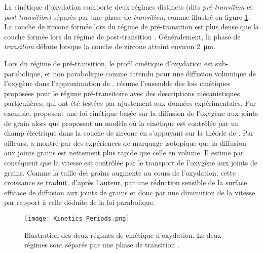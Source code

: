 \begin{refsection}
    La cinétique d'oxydation comporte deux régimes distincts (dits \emph{pré-transition} et \emph{post-transition}) séparés par
    une phase de \emph{transition}, comme illustré en figure \ref{fig:Zy2_Kinetics_Regimes}. 
    La couche de zircone formée lors du régime de pré-transition est plus dense que la couche formée lors du régime de
    post-transition \citep{IAEA1998}.
    Généralement, la phase de \emph{transition} débute lorsque la couche de zircone atteint
    environ \SI{2}{\micro\meter}.

    Lors du régime de pré-transition, le profil cinétique d'oxydation est sub-parabolique, et non parabolique
    comme attendu pour une diffusion volumique de l’oxygène dans l’approximation de \citet{Wagner1933}.
    \citet{Dali2007} résume l'ensemble des lois cinétiques proposées pour le régime pré-transitoire avec 
    des descriptions mécanistiques particulières, qui ont été testées par
    ajustement aux données expérimentales. Par exemple, \citet{Smeltzer1961} proposent une loi cinétique basée sur la diffusion de
    l'oxygène aux joints de grain alors que \citet{Eloff1991} proposent un modèle où la cinétique est contrôlée par un
    champ électrique dans la couche de zircone en s'appuyant sur la théorie de \citet{Fromhold1980}. Par ailleurs,
    \citet{Cox1968-1} a montré par des
    expériences de marquage isotopique que la diffusion aux joints grains est nettement plus rapide que celle en volume.
    Il estime par conséquent que la vitesse est contrôlée par le transport de l’oxygène aux joints de grains. Comme la
    taille des grains augmente au cours de l’oxydation, cette croissance se traduit,
    d’après l’auteur, par une réduction sensible de la surface efficace de diffusion aux joints de grains et donc par
    une diminution de la vitesse par rapport à celle déduite de la loi parabolique.


            
    
    \begin{figure}[H]
        \centering
        \texttt{[image: Kinetics\_Periods.png]}
        \caption[Illustration des deux régimes de cinétique d'oxydation. Le deux régimes sont séparés par une phase de
        transition.]{Illustration des deux régimes de cinétique d'oxydation. Le deux régimes sont séparés par une phase de
        transition \citep{Cox2005}.}
        \label{fig:Zy2_Kinetics_Regimes}
    \end{figure}



\end{refsection}
